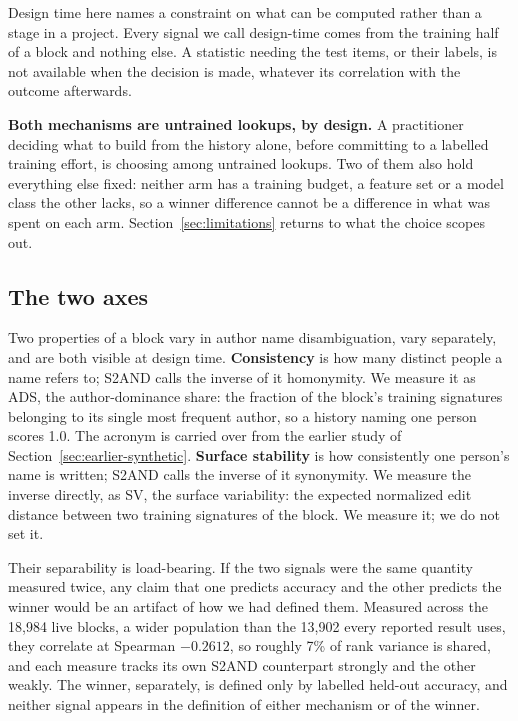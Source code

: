 \documentclass[11pt]{article}
\begin{document}
Design time here names a constraint on what can be computed rather than a
stage in a project. Every signal we call design-time comes from the training
half of a block and nothing else. A statistic needing the test items, or their labels,
is not available when the decision is made, whatever its correlation with the
outcome afterwards.

\textbf{Both mechanisms are untrained lookups, by design.} A practitioner
deciding what to build from the history alone, before committing to a labelled
training effort, is choosing among untrained lookups. Two of them also hold
everything else fixed: neither arm has a training budget, a feature set or a
model class the other lacks, so a winner difference cannot be a difference in
what was spent on each arm. Section~\ref{sec:limitations} returns to what the
choice scopes out.

\subsection{The two axes}
\label{sec:axes}

Two properties of a block vary in author name disambiguation, vary
separately, and are both visible at design time.
\textbf{Consistency} is how many distinct people a name refers to; S2AND
calls the inverse of it homonymity. We measure it as ADS, the
author-dominance share: the fraction of the block's training signatures
belonging to its single most frequent author, so a history naming one person
scores 1.0. The acronym is carried over from the earlier study of
Section~\ref{sec:earlier-synthetic}. \textbf{Surface stability} is how
consistently one person's name is written; S2AND calls the inverse of it
synonymity. We measure the inverse directly, as SV, the surface variability:
the expected normalized edit distance between two training signatures of the
block. We measure it; we do not set it.

Their separability is load-bearing. If the two signals were the same quantity
measured twice, any claim that one predicts accuracy and the other predicts
the winner would be an artifact of how we had defined them. Measured across
the 18{,}984 live blocks, a wider population than the 13{,}902 every reported
result uses, they correlate at Spearman $-0.2612$, so roughly 7\% of rank
variance is shared, and each measure tracks its own S2AND counterpart strongly
and the other weakly. The winner, separately, is defined only by labelled
held-out accuracy, and neither signal appears in the definition of either
mechanism or of the winner.
\end{document}

